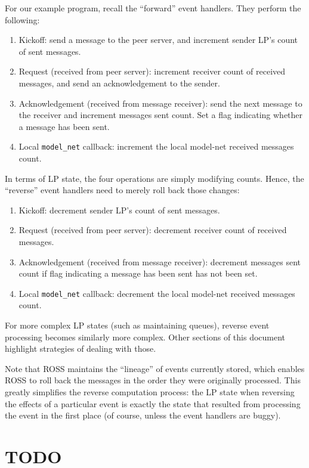\documentclass[conference,10pt,compsocconf,onecolumn]{IEEEtran}
\newcommand{\codesmodelnet}[1]{\texttt{model\_net}}
\begin{document}
For our example program, recall the ``forward'' event handlers. They perform the
following: 
\begin{enumerate}
    \item Kickoff: send a message to the peer server, and increment sender LP's
        count of sent messages.
    \item Request (received from peer server): increment receiver count of
        received messages, and send an acknowledgement to the sender.
    \item Acknowledgement (received from message receiver): send the next
        message to the receiver and increment messages sent count. Set a flag
        indicating whether a message has been sent.  
    \item Local \codesmodelnet{} callback: increment the local model-net
        received messages count.
\end{enumerate}

In terms of LP state, the four operations are simply modifying counts. Hence,
the ``reverse'' event handlers need to merely roll back those changes: 
\begin{enumerate}
    \item  Kickoff: decrement sender LP's count of sent messages.
    \item Request (received from peer server): decrement receiver count of
        received messages.
    \item Acknowledgement (received from message receiver): decrement messages
        sent count if flag indicating a message has been sent has not been
        set.
    \item Local \codesmodelnet{} callback: decrement the local model-net
        received messages count.
\end{enumerate}

For more complex LP states (such as maintaining queues), reverse event
processing becomes similarly more complex. Other sections of this document
highlight strategies of dealing with those.

Note that ROSS maintains the ``lineage'' of events currently stored, which
enables ROSS to roll back the messages in the order they were originally
processed. This greatly simplifies the reverse computation process: the LP state
when reversing the effects of a particular event is exactly the state that
resulted from processing the event in the first place (of course, unless the
event handlers are buggy).

\section{TODO}
\end{document}

